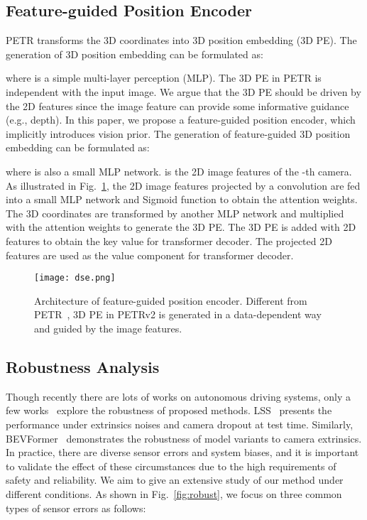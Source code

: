 \documentclass[10pt,twocolumn,letterpaper]{article}
\begin{document}
\subsection{Feature-guided Position Encoder}
\label{sec:fpe}
PETR transforms the 3D coordinates into 3D position embedding (3D PE).
The generation of 3D position embedding can be formulated as:

where  is a simple multi-layer perception (MLP). 
The 3D PE in PETR is independent with the input image. We argue that the 3D PE should be driven by the 2D features since the image feature can provide some informative guidance (e.g., depth).
In this paper, we propose a feature-guided position encoder, which implicitly introduces vision prior. 
The generation of feature-guided 3D position embedding can be formulated as:

where  is also a small MLP network.  is the 2D image features of the -th camera. As illustrated in Fig.~\ref{dse}, the 2D image features projected by a  convolution are fed into a small MLP network  and Sigmoid function to obtain the attention weights. The 3D coordinates are transformed by another MLP network  and multiplied with the attention weights to generate the 3D PE. The 3D PE is added with 2D features to obtain the key value for transformer decoder. The projected 2D features are used as the value component for transformer decoder.


\begin{figure}[h]
	\centering  
	\texttt{[image: dse.png]}
	\caption{Architecture of feature-guided position encoder. Different from PETR~\cite{liu2022petr}, 3D PE in PETRv2 is generated in a data-dependent way and guided by the image features.
    }  
	\label{dse}
\end{figure}

\subsection{Robustness Analysis}


Though recently there are lots of works on autonomous driving systems, only a few works~\cite{philion2020lift,li2022bevformer} explore the robustness of proposed methods.
LSS~\cite{philion2020lift} presents the performance under extrinsics noises and camera dropout at test time. 
Similarly, BEVFormer~\cite{li2022bevformer} demonstrates the robustness of model variants to camera extrinsics.
In practice, there are diverse sensor errors and system biases, and it is important to validate the effect of these circumstances due to the high requirements of safety and reliability. 
We aim to give an extensive study of our method under different conditions. As shown in Fig.~\ref{fig:robust}, 
we focus on three common types of sensor errors as follows:
\end{document}

